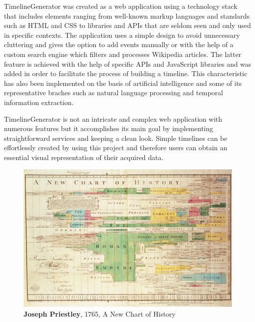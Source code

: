 \documentclass{report}
\begin{document}
TimelineGenerator was created as a web application using a technology stack that includes elements ranging from well-known markup languages and standards such as HTML and CSS to libraries and APIs that are seldom seen and only used in specific contexts. The application uses a simple design to avoid unnecessary cluttering and gives the option to add events manually or with the help of a custom search engine which filters and processes Wikipedia articles. The latter feature is achieved with the help of specific APIs and JavaScript libraries and was added in order to facilitate the process of building a timeline. This characteristic has also been implemented on the basis of artificial intelligence and some of its representative braches such as natural language processing and temporal information extraction.\par

TimelineGenerator is not an intricate and complex web application with numerous features but it accomplishes its main goal by implementing straightforward services and keeping a clean look. Simple timelines can be effortlessly created by using this project and therefore users can obtain an essential visual representation of their acquired data.

\begin{figure}[h]
\vspace*{4cm}
\centerline{\includegraphics[scale=1.6]{htl}}
\caption{\textbf{Joseph Priestley}, 1765, A New Chart of History}
\end{figure}
\newpage
\end{document}
